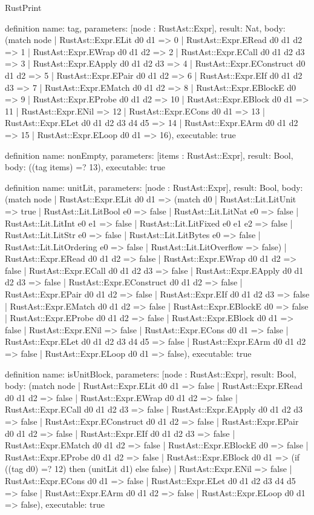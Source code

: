 \begin{lexlean}{RustPrint}
\begin{semanticmodule}
definition{
  name: tag,
  parameters: [node : RustAst::Expr],
  result: Nat,
  body: (match node
    | RustAst::Expr.ELit d0 d1 => 0
    | RustAst::Expr.ERead d0 d1 d2 => 1
    | RustAst::Expr.EWrap d0 d1 d2 => 2
    | RustAst::Expr.ECall d0 d1 d2 d3 => 3
    | RustAst::Expr.EApply d0 d1 d2 d3 => 4
    | RustAst::Expr.EConstruct d0 d1 d2 => 5
    | RustAst::Expr.EPair d0 d1 d2 => 6
    | RustAst::Expr.EIf d0 d1 d2 d3 => 7
    | RustAst::Expr.EMatch d0 d1 d2 => 8
    | RustAst::Expr.EBlockE d0 => 9
    | RustAst::Expr.EProbe d0 d1 d2 => 10
    | RustAst::Expr.EBlock d0 d1 => 11
    | RustAst::Expr.ENil => 12
    | RustAst::Expr.ECons d0 d1 => 13
    | RustAst::Expr.ELet d0 d1 d2 d3 d4 d5 => 14
    | RustAst::Expr.EArm d0 d1 d2 => 15
    | RustAst::Expr.ELoop d0 d1 => 16),
  executable: true
}

definition{
  name: nonEmpty,
  parameters: [items : RustAst::Expr],
  result: Bool,
  body: ((tag items) =? 13),
  executable: true
}

definition{
  name: unitLit,
  parameters: [node : RustAst::Expr],
  result: Bool,
  body: (match node
    | RustAst::Expr.ELit d0 d1 => (match d0
      | RustAst::Lit.LitUnit => true
      | RustAst::Lit.LitBool e0 => false
      | RustAst::Lit.LitNat e0 => false
      | RustAst::Lit.LitInt e0 e1 => false
      | RustAst::Lit.LitFixed e0 e1 e2 => false
      | RustAst::Lit.LitStr e0 => false
      | RustAst::Lit.LitBytes e0 => false
      | RustAst::Lit.LitOrdering e0 => false
      | RustAst::Lit.LitOverflow => false)
    | RustAst::Expr.ERead d0 d1 d2 => false
    | RustAst::Expr.EWrap d0 d1 d2 => false
    | RustAst::Expr.ECall d0 d1 d2 d3 => false
    | RustAst::Expr.EApply d0 d1 d2 d3 => false
    | RustAst::Expr.EConstruct d0 d1 d2 => false
    | RustAst::Expr.EPair d0 d1 d2 => false
    | RustAst::Expr.EIf d0 d1 d2 d3 => false
    | RustAst::Expr.EMatch d0 d1 d2 => false
    | RustAst::Expr.EBlockE d0 => false
    | RustAst::Expr.EProbe d0 d1 d2 => false
    | RustAst::Expr.EBlock d0 d1 => false
    | RustAst::Expr.ENil => false
    | RustAst::Expr.ECons d0 d1 => false
    | RustAst::Expr.ELet d0 d1 d2 d3 d4 d5 => false
    | RustAst::Expr.EArm d0 d1 d2 => false
    | RustAst::Expr.ELoop d0 d1 => false),
  executable: true
}

definition{
  name: isUnitBlock,
  parameters: [node : RustAst::Expr],
  result: Bool,
  body: (match node
    | RustAst::Expr.ELit d0 d1 => false
    | RustAst::Expr.ERead d0 d1 d2 => false
    | RustAst::Expr.EWrap d0 d1 d2 => false
    | RustAst::Expr.ECall d0 d1 d2 d3 => false
    | RustAst::Expr.EApply d0 d1 d2 d3 => false
    | RustAst::Expr.EConstruct d0 d1 d2 => false
    | RustAst::Expr.EPair d0 d1 d2 => false
    | RustAst::Expr.EIf d0 d1 d2 d3 => false
    | RustAst::Expr.EMatch d0 d1 d2 => false
    | RustAst::Expr.EBlockE d0 => false
    | RustAst::Expr.EProbe d0 d1 d2 => false
    | RustAst::Expr.EBlock d0 d1 => (if ((tag d0) =? 12) then (unitLit d1) else false)
    | RustAst::Expr.ENil => false
    | RustAst::Expr.ECons d0 d1 => false
    | RustAst::Expr.ELet d0 d1 d2 d3 d4 d5 => false
    | RustAst::Expr.EArm d0 d1 d2 => false
    | RustAst::Expr.ELoop d0 d1 => false),
  executable: true
}


\end{semanticmodule}
\end{lexlean}

